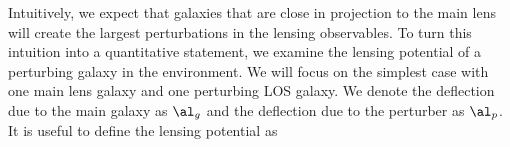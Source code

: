 Intuitively, we expect that galaxies that are close in projection to the main lens will create the largest perturbations in the lensing observables. To turn this intuition into a quantitative statement, we examine the lensing potential of a perturbing galaxy in the environment. We will focus on the simplest case with one main lens galaxy and one perturbing LOS galaxy. We denote the deflection due to the main galaxy as $\al_{g}$ and the deflection due to the perturber as $\al_p$. It is useful to define the lensing potential as